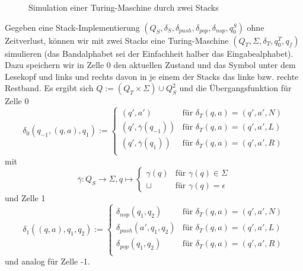 \documentclass{article}
\begin{document}
\begin{beispiel}
    \begin{figure}[h]
        \centering
        \caption{Simulation einer Turing-Maschine durch zwei Stacks}
    \end{figure}
    Gegeben eine Stack-Implementierung $(Q_S, \delta_S, \delta_{push}, \delta_{pop}, \delta_{nop}, q^S_0)$ ohne Zeitverlust, können wir mit zwei Stacks eine Turing-Maschine $(Q_T, \Sigma, \delta_T, q^T_0, q_f)$ simulieren (das Bandalphabet sei der Einfachheit halber das Eingabealphabet). Dazu speichern wir in Zelle 0  den aktuellen Zustand und das Symbol unter dem Lesekopf und links und rechts davon in je einem der Stacks das linke bzw. rechte Restband. Es ergibt sich $Q := (Q_T \times \Sigma) \cup Q^2_S$ und die Übergangsfunktion für Zelle 0
    \[ \delta_0(q_{-1}, (q, a), q_1) :=
    \begin{cases}
        (q', a') &\text{für } \delta_T(q, a) = (q', a', N) \\
        (q', \bar\gamma(q_{-1})) &\text{für } \delta_T(q, a) = (q', a', L) \\
        (q', \bar\gamma(q_1)) &\text{für } \delta_T(q, a) = (q', a', R) \\
    \end{cases} \]
mit
\[ \bar\gamma : Q_S \rightarrow \Sigma, q \mapsto \begin{cases}
        \gamma(q) &\text{für } \gamma(q) \in \Sigma \\
        \sqcup &\text{für } \gamma(q) = \epsilon
    \end{cases} \]
und Zelle 1
    \[ \delta_1((q, a), q_1, q_2) :=
    \begin{cases}
        \delta_{nop}(q_1, q_2) &\text{für } \delta_T(q, a) = (q', a', N) \\
        \delta_{push}(a', q_1, q_2) &\text{für } \delta_T(q, a) = (q', a', L) \\
        \delta_{pop}(q_1, q_2) &\text{für } \delta_T(q, a) = (q', a', R) \\
    \end{cases} \]
und analog für Zelle -1.
\end{beispiel}
\end{document}
